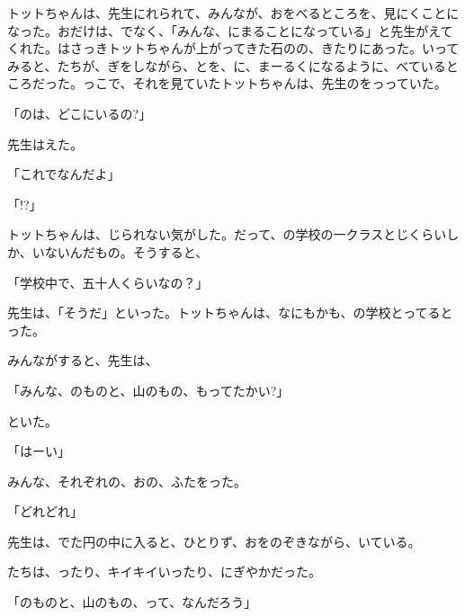トットちゃんは、先生にれられて、みんなが、おをべるところを、見にくことになった。おだけは、でなく、「みんな、にまることになっている」と先生がえてくれた。はさっきトットちゃんが上がってきた石のの、きたりにあった。いってみると、たちが、ぎをしながら、とを、に、まーるくになるように、べているところだった。っこで、それを見ていたトットちゃんは、先生のをっっていた。

「のは、どこにいるの?」

先生はえた。

「これでなんだよ」

「!?」

トットちゃんは、じられない気がした。だって、の学校の一クラスとじくらいしか、いないんだもの。そうすると、

「学校中で、五十人くらいなの？」

先生は、「そうだ」といった。トットちゃんは、なにもかも、の学校とってるとった。

みんながすると、先生は、

「みんな、のものと、山のもの、もってたかい?」

といた。

「はーい」

みんな、それぞれの、おの、ふたをった。

「どれどれ」

先生は、でた円の中に入ると、ひとりず、おをのぞきながら、いている。

たちは、ったり、キイキイいったり、にぎやかだった。

「のものと、山のもの、って、なんだろう」

